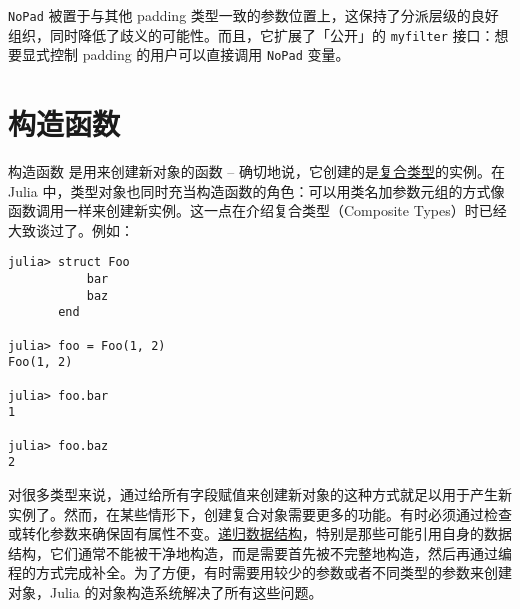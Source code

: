 \texttt{NoPad} 被置于与其他 padding 类型一致的参数位置上，这保持了分派层级的良好组织，同时降低了歧义的可能性。而且，它扩展了「公开」的 \texttt{myfilter} 接口：想要显式控制 padding 的用户可以直接调用 \texttt{NoPad} 变量。





\hypertarget{17317810227993044854}{}


\chapter{构造函数}



构造函数 \footnotemark[1] 是用来创建新对象的函数 – 确切地说，它创建的是\hyperlink{4168730090950432836}{复合类型}的实例。在 Julia 中，类型对象也同时充当构造函数的角色：可以用类名加参数元组的方式像函数调用一样来创建新实例。这一点在介绍复合类型（Composite Types）时已经大致谈过了。例如：




\begin{verbatim}
julia> struct Foo
           bar
           baz
       end

julia> foo = Foo(1, 2)
Foo(1, 2)

julia> foo.bar
1

julia> foo.baz
2
\end{verbatim}



对很多类型来说，通过给所有字段赋值来创建新对象的这种方式就足以用于产生新实例了。然而，在某些情形下，创建复合对象需要更多的功能。有时必须通过检查或转化参数来确保固有属性不变。\href{https://en.wikipedia.org/wiki/Recursion\_\%28computer\_science\%29\#Recursive\_data\_structures\_.28structural\_recursion.29}{递归数据结构}，特别是那些可能引用自身的数据结构，它们通常不能被干净地构造，而是需要首先被不完整地构造，然后再通过编程的方式完成补全。为了方便，有时需要用较少的参数或者不同类型的参数来创建对象，Julia 的对象构造系统解决了所有这些问题。





